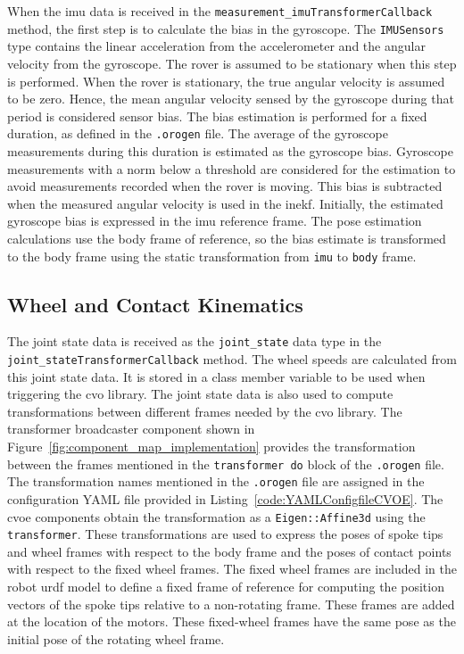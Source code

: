 \documentclass[report.tex]{subfiles}
\begin{document}
    When the \gls{imu} data is received in the \texttt{measurement\_imuTransformerCallback} method, the first step is to calculate the bias in the gyroscope. The \texttt{IMUSensors} type contains the linear acceleration from the accelerometer and the angular velocity from the gyroscope. The rover is assumed to be stationary when this step is performed. When the rover is stationary, the true angular velocity is assumed to be zero. Hence, the mean angular velocity sensed by the gyroscope during that period is considered sensor bias. The bias estimation is performed for a fixed duration, as defined in the \texttt{.orogen} file. The average of the gyroscope measurements during this duration is estimated as the gyroscope bias. Gyroscope measurements with a norm below a threshold are considered for the estimation to avoid measurements recorded when the rover is moving. This bias is subtracted when the measured angular velocity is used in the \gls{inekf}. Initially, the estimated gyroscope bias is expressed in the \gls{imu} reference frame. The pose estimation calculations use the body frame of reference, so the bias estimate is transformed to the body frame using the static transformation from \texttt{imu} to \texttt{body} frame. 

    \subsection{Wheel and Contact Kinematics} \label{subsec:wheelAndContactKinematics}

    The joint state data is received as the \texttt{joint\_state} data type in the \texttt{joint\_stateTransformerCallback} method. The wheel speeds are calculated from this joint state data. It is stored in a class member variable to be used when triggering the \gls{cvo} library. The joint state data is also used to compute transformations between different frames needed by the \gls{cvo} library. The transformer broadcaster component shown in Figure~\ref{fig:component_map_implementation} provides the transformation between the frames mentioned in the \texttt{transformer do} block of the \texttt{.orogen} file. The transformation names mentioned in the \texttt{.orogen} file are assigned in the configuration YAML file provided in Listing~\ref{code:YAMLConfigfileCVOE}. The \gls{cvoe} components obtain the transformation as a \texttt{Eigen::Affine3d} using the \texttt{transformer}. These transformations are used to express the poses of spoke tips and wheel frames with respect to the body frame and the poses of contact points with respect to the fixed wheel frames. The fixed wheel frames are included in the robot \gls{urdf} model to define a fixed frame of reference for computing the position vectors of the spoke tips relative to a non-rotating frame. These frames are added at the location of the motors. These fixed-wheel frames have the same pose as the initial pose of the rotating wheel frame.
\end{document}
